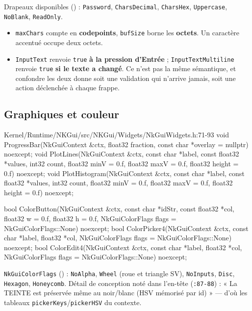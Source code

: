 Drapeaux disponibles () : \texttt{Password},
\texttt{CharsDecimal}, \texttt{CharsHex}, \texttt{Uppercase}, \texttt{NoBlank},
\texttt{ReadOnly}.

\begin{nkretenir}
\begin{itemize}
  \item \texttt{maxChars} compte en \textbf{codepoints}, \texttt{bufSize} borne
        les \textbf{octets}. Un caractère accentué occupe deux octets.
  \item \texttt{InputText} renvoie \texttt{true} \textbf{à la pression
        d'Entrée} ; \texttt{InputTextMultiline} renvoie \texttt{true}
        \textbf{si le texte a changé}. Ce n'est pas la même sémantique, et
        confondre les deux donne soit une validation qui n'arrive jamais, soit
        une action déclenchée à chaque frappe.
\end{itemize}
\end{nkretenir}

\subsection{Graphiques et couleur}

\begin{nkcode}{Kernel/Runtime/NKGui/src/NKGui/Widgets/NkGuiWidgets.h:71-93}
void ProgressBar(NkGuiContext &ctx, float32 fraction, const char *overlay = nullptr) noexcept;
void PlotLines(NkGuiContext &ctx, const char *label, const float32 *values, int32 count,
               float32 minV = 0.f, float32 maxV = 0.f, float32 height = 0.f) noexcept;
void PlotHistogram(NkGuiContext &ctx, const char *label, const float32 *values, int32 count,
                   float32 minV = 0.f, float32 maxV = 0.f, float32 height = 0.f) noexcept;

bool ColorButton(NkGuiContext &ctx, const char *idStr, const float32 *col, float32 w = 0.f,
                 float32 h = 0.f, NkGuiColorFlags flags = NkGuiColorFlags::None) noexcept;
bool ColorPicker4(NkGuiContext &ctx, const char *label, float32 *col,
                  NkGuiColorFlags flags = NkGuiColorFlags::None) noexcept;
bool ColorEdit4(NkGuiContext &ctx, const char *label, float32 *col,
                NkGuiColorFlags flags = NkGuiColorFlags::None) noexcept;
\end{nkcode}

\texttt{NkGuiColorFlags} () : \texttt{NoAlpha},
\texttt{Wheel} (roue et triangle SV), \texttt{NoInputs}, \texttt{Disc},
\texttt{Hexagon}, \texttt{Honeycomb}. Détail de conception noté dans l'en-tête
(\texttt{:87-88}) : « La TEINTE est préservée même au noir/blanc (HSV mémorisé par
id) » — d'où les tableaux \texttt{pickerKeys}/\texttt{pickerHSV} du contexte.

